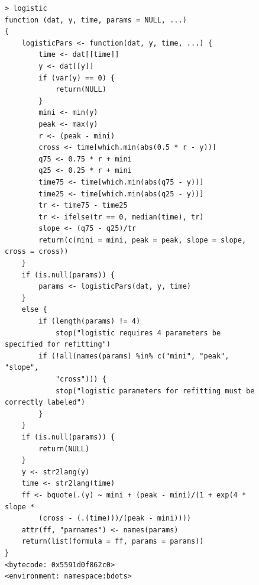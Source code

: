 \documentclass{article}
\begin{document}
\begin{singlespace}
\begin{figure}[H]
\centering
\begin{BVerbatim}
> logistic
function (dat, y, time, params = NULL, ...) 
{
    logisticPars <- function(dat, y, time, ...) {
        time <- dat[[time]]
        y <- dat[[y]]
        if (var(y) == 0) {
            return(NULL)
        }
        mini <- min(y)
        peak <- max(y)
        r <- (peak - mini)
        cross <- time[which.min(abs(0.5 * r - y))]
        q75 <- 0.75 * r + mini
        q25 <- 0.25 * r + mini
        time75 <- time[which.min(abs(q75 - y))]
        time25 <- time[which.min(abs(q25 - y))]
        tr <- time75 - time25
        tr <- ifelse(tr == 0, median(time), tr)
        slope <- (q75 - q25)/tr
        return(c(mini = mini, peak = peak, slope = slope, cross = cross))
    }
    if (is.null(params)) {
        params <- logisticPars(dat, y, time)
    }
    else {
        if (length(params) != 4) 
            stop("logistic requires 4 parameters be specified for refitting")
        if (!all(names(params) %in% c("mini", "peak", "slope", 
            "cross"))) {
            stop("logistic parameters for refitting must be correctly labeled")
        }
    }
    if (is.null(params)) {
        return(NULL)
    }
    y <- str2lang(y)
    time <- str2lang(time)
    ff <- bquote(.(y) ~ mini + (peak - mini)/(1 + exp(4 * slope * 
        (cross - (.(time)))/(peak - mini))))
    attr(ff, "parnames") <- names(params)
    return(list(formula = ff, params = params))
}
<bytecode: 0x5591d0f862c0>
<environment: namespace:bdots>
\end{BVerbatim}
\end{figure}
\end{singlespace}
\end{document}
